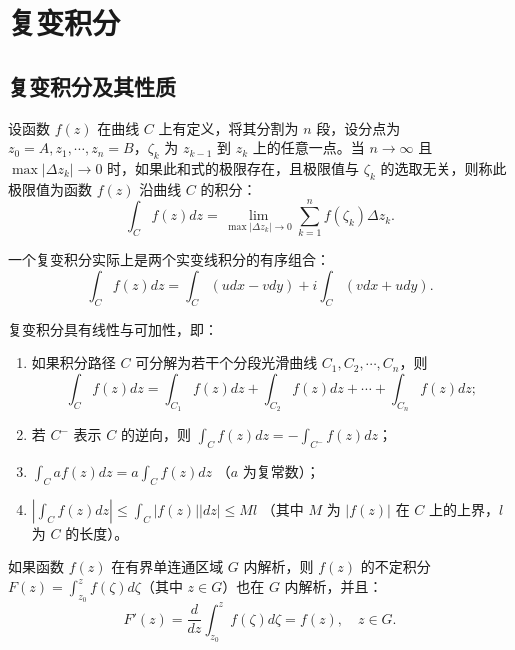 \chapter{复变积分}

\section{复变积分及其性质}

\begin{definition}[复变积分]
设函数 \(f(z)\) 在曲线 \(C\) 上有定义，将其分割为 \(n\) 段，设分点为 \(z_0=A, z_1, \cdots, z_n=B\)，\(\zeta_k\) 为 \(z_{k-1}\) 到 \(z_k\) 上的任意一点。当 \(n \to \infty\) 且 \(\max|\Delta z_k| \to 0\) 时，如果此和式的极限存在，且极限值与 \(\zeta_k\) 的选取无关，则称此极限值为函数 \(f(z)\) 沿曲线 \(C\) 的积分：
\[
\int_C f(z) dz = \lim_{\max|\Delta z_k| \to 0} \sum_{k=1}^n f(\zeta_k) \Delta z_k.
\]
\end{definition}

\begin{definition}[复变积分与实变积分的关系]
一个复变积分实际上是两个实变线积分的有序组合：
\[
\int_C f(z) dz = \int_C (u dx - v dy) + i \int_C (v dx + u dy).
\]
\end{definition}

\begin{theorem}[复变积分的线性与可加性]
    复变积分具有线性与可加性，即：

\begin{enumerate}
    \item 如果积分路径 \(C\) 可分解为若干个分段光滑曲线 \(C_1, C_2, \cdots, C_n\)，则 
    \[
    \int_C f(z) dz = \int_{C_1} f(z) dz + \int_{C_2} f(z) dz + \cdots + \int_{C_n} f(z) dz;
    \]
    \item 若 \(C^-\) 表示 \(C\) 的逆向，则 \(\int_C f(z) dz = - \int_{C^-} f(z) dz\)；
    \item \(\int_C a f(z) dz = a \int_C f(z) dz\) （\(a\) 为复常数）；
    \item \(|\int_C f(z) dz| \le \int_C |f(z)| |dz| \le M l\) （其中 \(M\) 为 \(|f(z)|\) 在 \(C\) 上的上界，\(l\) 为 \(C\) 的长度）。
\end{enumerate}
\end{theorem}

\begin{theorem}[不定积分的解析性]
如果函数 \(f(z)\) 在有界单连通区域 \(G\) 内解析，则 \(f(z)\) 的不定积分 \(F(z) = \int_{z_0}^z f(\zeta) d\zeta\)（其中 \(z \in G\)）也在 \(G\) 内解析，并且：
\[
F'(z) = \frac{d}{dz} \int_{z_0}^z f(\zeta) d\zeta = f(z), \quad z \in G.
\]
\end{theorem}

